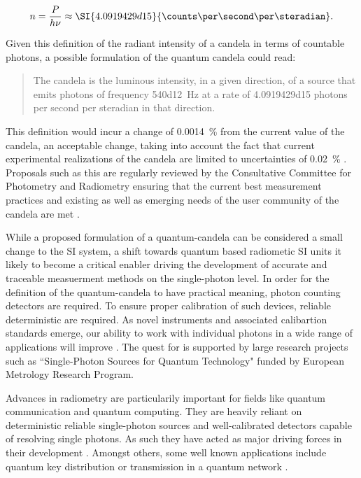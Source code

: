 		\begin{equation}
			n = \frac{P}{h \nu} \approx \SI{4.0919429d15}{\counts\per\second\per\steradian}.
		\end{equation}

	Given this definition of the radiant intensity of a candela in terms of countable photons, a possible formulation of the quantum candela could read:

	\begin{quote}
		The candela is the luminous intensity, in a given direction, of a source that emits photons of frequency \SI{540d12}{\hertz} at a rate of \num{4.0919429d15} photons per second per steradian in that direction.
	\end{quote}

	This definition would incur a change of \SI{0.0014}{\percent} from the current value of the candela, an acceptable change, taking into account the fact that current experimental realizations of the candela are limited to uncertainties of \SI{0.02}{\percent} \cite{Cheung2007}. Proposals such as this are regularly reviewed by the Consultative Committee for Photometry and Radiometry ensuring that the current best measurement practices and existing as well as emerging needs of the user community of the candela are met \cite{zwinckels::paper}.

	While a proposed formulation of a quantum-candela can be considered a small change to the SI system, a shift towards quantum based radiometic SI units it likely to become a critical enabler driving the development of accurate and traceable measuerment methods on the single-photon level. In order for the definition of the quantum-candela to have practical meaning, photon counting detectors are required. To ensure proper calibration of such devices, reliable deterministic \spss are required. As novel instruments and associated calibartion standards emerge, our ability to work with individual photons in a wide range of applications will improve \cite{Rodiek2017::1, Rodiek2017::2, Rodiek2017::3, Rodiek2017::4}. The quest for \spss is supported by large research projects such as ``Single-Photon Sources for Quantum Technology" funded by European Metrology Research Program.

	Advances in radiometry are particularily important for fields like quantum communication and quantum computing. They are heavily reliant on deterministic reliable single-photon sources and well-calibrated detectors capable of resolving single photons. As such they have acted as major driving forces in their development \cite{vaigu2017::1, vaigu2017::2}. Amongst others, some well known applications include quantum key distribution \cite{janine::12, janine::28, janine::29} or transmission in a quantum network \cite{janine::18, janine::51, janine::54}.

